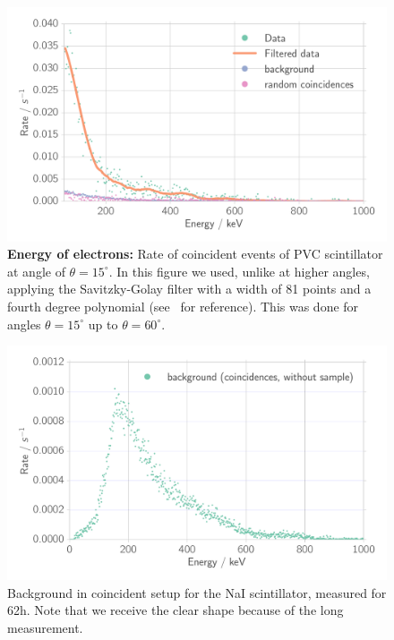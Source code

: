 \begin{figure}[htpb]
    \centering
    \includegraphics[width=0.9\linewidth]{./analysis/figures/coin_ps_15_filter_}
    \caption{\textbf{Energy of electrons:}
        Rate of coincident events of 
        PVC scintillator at angle of $\theta = 15^\circ$.
        In this figure we used, unlike at higher angles, applying the Savitzky-Golay filter
        with a width of 81 points and a fourth
        degree polynomial (see~\cite{scipy} for reference). This was done for 
        angles $\theta = 15^\circ$ up to $\theta = 60^\circ$.}
\label{fig:coin_ps_15}
\end{figure}

\begin{figure}[htpb]
    \centering
    \includegraphics[width=0.9\linewidth]{./analysis/figures/coin_na_background}
    \caption{Background in coincident setup for the NaI scintillator, measured for 62h. Note that we receive the clear shape because of the long measurement. } \label{fig:coin_na_background}
\end{figure}

